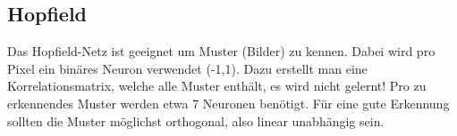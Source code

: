 \subsection{Hopfield}
Das Hopfield-Netz ist geeignet um Muster (Bilder) zu kennen. Dabei wird pro Pixel ein binäres Neuron
verwendet (-1,1).  Dazu erstellt man eine Korrelationsmatrix, welche alle Muster enthält, es wird
nicht gelernt!  Pro zu erkennendes Muster werden etwa 7 Neuronen benötigt.  Für eine gute Erkennung
sollten die Muster möglichst orthogonal, also linear unabhängig sein.

